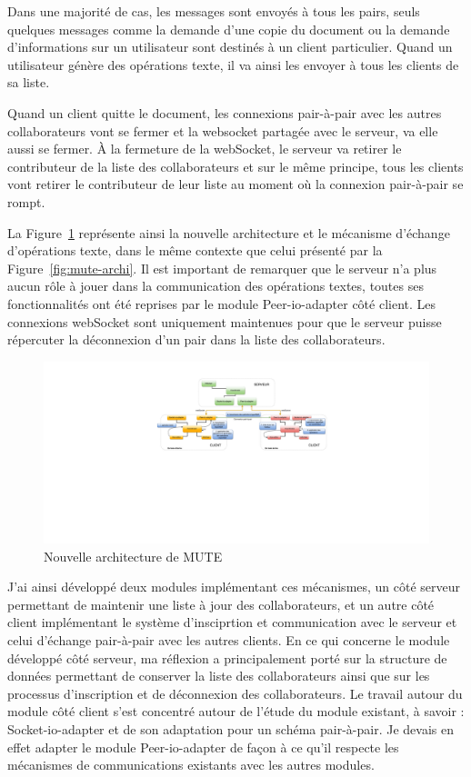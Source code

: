 \documentclass{tnreport}
\begin{document}
Dans une majorité de cas, les messages sont envoyés à tous les pairs, seuls quelques messages comme la demande d'une copie du document ou la demande d'informations sur un utilisateur sont destinés à un client particulier. Quand un utilisateur génère des opérations texte, il va ainsi les envoyer à tous les clients de sa liste.

Quand un client quitte le document, les connexions pair-à-pair avec les autres collaborateurs vont se fermer et la websocket partagée avec le serveur, va elle aussi se fermer. À la fermeture de la webSocket, le serveur va retirer le contributeur de la liste des collaborateurs et sur le même principe, tous les clients vont retirer le contributeur de leur liste au moment où la connexion pair-à-pair se rompt. 

La Figure~\ref{fig:mute-archi-p2p} représente ainsi la nouvelle architecture et le mécanisme d'échange d'opérations texte, dans le même contexte que celui présenté par la Figure~\ref{fig:mute-archi}. Il est important de remarquer que le serveur n'a plus aucun rôle à jouer dans la communication des opérations textes, toutes ses fonctionnalités ont été reprises par le module Peer-io-adapter côté client. Les connexions webSocket sont uniquement maintenues pour que le serveur puisse répercuter la déconnexion d'un pair dans la liste des collaborateurs.

\begin{figure}[!h]
  \centering
  \includegraphics[width=17cm]{figures/MUTE-archi-p2p}
  \caption{Nouvelle architecture de MUTE}
  \label{fig:mute-archi-p2p}
\end{figure}

J'ai ainsi développé deux modules implémentant ces mécanismes, un côté serveur permettant de maintenir une liste à jour des collaborateurs, et un autre côté client implémentant le système d'insciprtion et communication avec le serveur et celui d'échange pair-à-pair avec les autres clients. En ce qui concerne le module développé côté serveur, ma réflexion a principalement porté sur la structure de données permettant de conserver la liste des collaborateurs ainsi que sur les processus d'inscription et de déconnexion des collaborateurs. Le travail autour du module côté client s'est concentré autour de l'étude du module existant, à savoir : Socket-io-adapter et de son adaptation pour un schéma pair-à-pair. Je devais en effet adapter le module Peer-io-adapter de façon à ce qu'il respecte les mécanismes de communications existants avec les autres modules.
\end{document}
